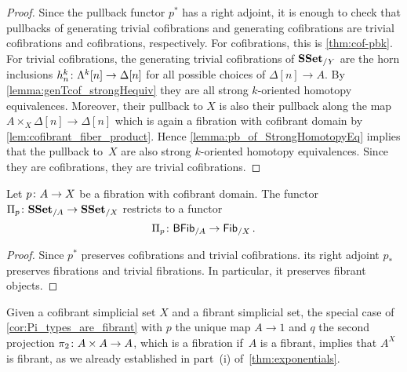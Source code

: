 \documentclass[reqno,10pt,a4paper,oneside,draft]{amsart}
\begin{document}
\begin{proof} Since the pullback functor $p^*$ has a right adjoint,  it is enough to check that pullbacks of generating trivial cofibrations and generating cofibrations are trivial cofibrations and cofibrations, respectively. For cofibrations, this is \cref{thm:cof-pbk}. For trivial cofibrations, the generating trivial cofibrations of $\mathbf{SSet}_{/Y}$ are the horn inclusions $h^k_n \colon \Lambda^{k}[n] \rightarrow \Delta[n]$ for all possible choices of $\Delta[n] \rightarrow A$. By \cref{lemma:genTcof_strongHequiv} they are all strong $k$-oriented homotopy equivalences. Moreover, their pullback to $X$ is also their pullback along the map $A \times_X \Delta[n] \rightarrow \Delta[n]$ which is again a fibration with cofibrant domain by \cref{lem:cofibrant_fiber_product}. Hence  \cref{lemma:pb_of_StrongHomotopyEq} implies that the pullback 
to~$X$ are also strong $k$-oriented homotopy equivalences. Since they are cofibrations, they are trivial cofibrations.
\end{proof}



\begin{corollary}\label{cor:Pi_types_are_fibrant}
Let $p \colon A \rightarrow X$ be a fibration with cofibrant domain. The functor $\Pi_p \colon \mathbf{SSet}_{/A} \to \mathbf{SSet}_{/X}$ restricts to a functor
\[
\Pi_p \colon \mathsf{BFib}_{/A}  \to \mathsf{Fib}_{/X} \, .
\]
\end{corollary}

\begin{proof}
Since $p^*$ preserves cofibrations and trivial cofibrations. its right adjoint $p_*$ preserves fibrations and trivial fibrations. In particular, it preserves fibrant objects.
\end{proof}


Given a cofibrant simplicial set $X$ and a fibrant simplicial set, the special case of \cref{cor:Pi_types_are_fibrant} with $p$   the unique map $A \to 1$ and $q$ the second projection 
$\pi_2 \colon A \times A \to A$, which is a fibration if~$A$ is a  fibrant, implies that $A^X$ is fibrant, as we already established in part~(i) 
of~\cref{thm:exponentials}. 




\end{document}
